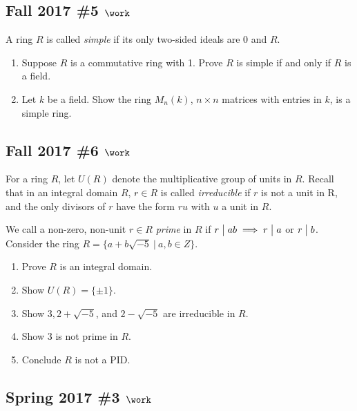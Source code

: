 \hypertarget{fall-2017-5-work}{%
\subsection{\texorpdfstring{Fall 2017 \#5
\(\work\)}{Fall 2017 \#5 \textbackslash work}}\label{fall-2017-5-work}}

A ring \(R\) is called \emph{simple} if its only two-sided ideals are
\(0\) and \(R\).

\begin{enumerate}
\def\labelenumi{\alph{enumi}.}
\item
  Suppose \(R\) is a commutative ring with 1. Prove \(R\) is simple if
  and only if \(R\) is a field.
\item
  Let \(k\) be a field. Show the ring \(M_n (k)\), \(n \times n\)
  matrices with entries in \(k\), is a simple ring.
\end{enumerate}

\hypertarget{fall-2017-6-work}{%
\subsection{\texorpdfstring{Fall 2017 \#6
\(\work\)}{Fall 2017 \#6 \textbackslash work}}\label{fall-2017-6-work}}

For a ring \(R\), let \(U(R)\) denote the multiplicative group of units
in \(R\). Recall that in an integral domain \(R\), \(r \in R\) is called
\emph{irreducible} if \(r\) is not a unit in R, and the only divisors of
\(r\) have the form \(ru\) with \(u\) a unit in \(R\).

We call a non-zero, non-unit \(r \in R\) \emph{prime} in \(R\) if
\(r \bigm|ab \implies r \bigm|a\) or \(r \bigm|b\). Consider the ring
\(R = \{a + b \sqrt{-5}{~\mathrel{\Big|}~}a, b \in Z\}\).

\begin{enumerate}
\def\labelenumi{\alph{enumi}.}
\item
  Prove \(R\) is an integral domain.
\item
  Show \(U(R) = \{\pm1\}\).
\item
  Show \(3, 2 + \sqrt{-5}\), and \(2 - \sqrt{-5}\) are irreducible in
  \(R\).
\item
  Show 3 is not prime in \(R\).
\item
  Conclude \(R\) is not a PID.
\end{enumerate}

\hypertarget{spring-2017-3-work}{%
\subsection{\texorpdfstring{Spring 2017 \#3
\(\work\)}{Spring 2017 \#3 \textbackslash work}}\label{spring-2017-3-work}}

